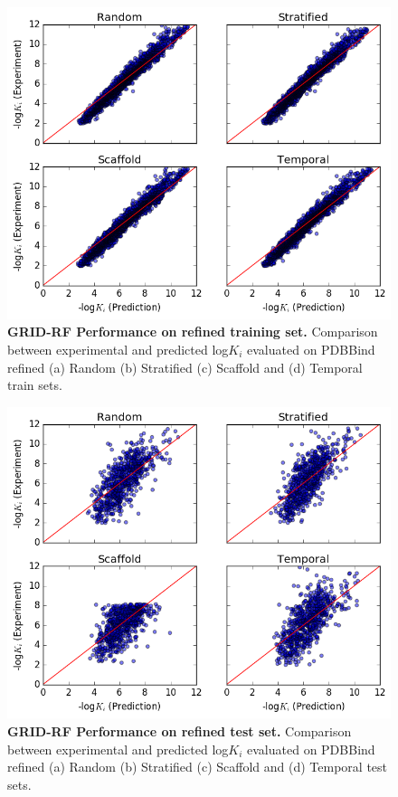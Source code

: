 \begin{figure}
    \centering
    \includegraphics[width=\textwidth]{Images/grid_refined_train.png}
    \caption{\textbf{GRID-RF Performance on refined training set.} Comparison between experimental and predicted log$K_i$ evaluated on PDBBind refined (a) Random (b) Stratified (c) Scaffold and (d) Temporal train sets.}
    \label{fig:acnn_core_train}
\end{figure}
\begin{figure}
    \centering
    \includegraphics[width=\textwidth]{Images/grid_refined_test.png}
    \caption{\textbf{GRID-RF Performance on refined test set.} Comparison between experimental and predicted log$K_i$ evaluated on PDBBind refined (a) Random (b) Stratified (c) Scaffold and (d) Temporal test sets.}
    \label{fig:acnn_core_test}
\end{figure}